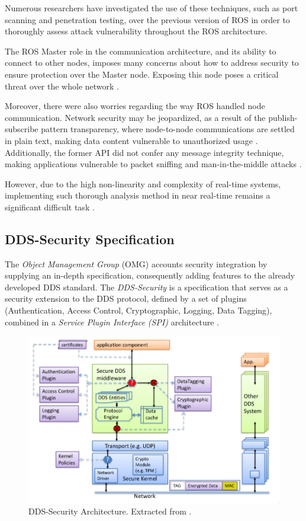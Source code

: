 Numerous researchers \cite{8794451, dieber2020penetration} have investigated the use of these techniques, such as port scanning and penetration testing, over the previous version of ROS in order to thoroughly assess attack vulnerability throughout the ROS architecture. 

The ROS Master role in the communication architecture, and its ability to connect to other nodes, imposes many concerns about how to address security to ensure protection over the Master node. Exposing this node poses a critical threat over the whole network \cite{8794451}. 

Moreover, there were also worries regarding the way ROS handled node communication. Network security may be jeopardized, as a result of the publish-subscribe pattern transparency, where node-to-node communications are settled in plain text, making data content vulnerable to unauthorized usage \cite{kim2018security, white2016sros}. Additionally, the former API did not confer any message integrity technique, making applications vulnerable to packet sniffing and man-in-the-middle attacks \cite{white2016sros}.
 
However, due to the high non-linearity and complexity of real-time systems, implementing such thorough analysis method in near real-time remains a significant difficult task \cite{diao2009design}.

\subsection{DDS-Security Specification}

The \textit{Object Management Group} (OMG) \cite{3} accounts security integration by supplying an in-depth specification, consequently adding features to the already developed DDS standard. The \textit{DDS-Security} is a specification that serves as a security extension to the DDS protocol, defined by a set of plugins (Authentication, Access Control, Cryptographic, Logging, Data Tagging), combined in a \textit{Service Plugin Interface (SPI)} architecture \cite{8442103, ros-dds-integration}.

\begin{figure}[H]
    \centering
    \includegraphics[width=0.7\linewidth]{img/dds-security-architecture.png}
    \caption{DDS-Security Architecture. Extracted from \cite{dds-s}.}
    \label{fig:dds-security-architecture}
\end{figure}

